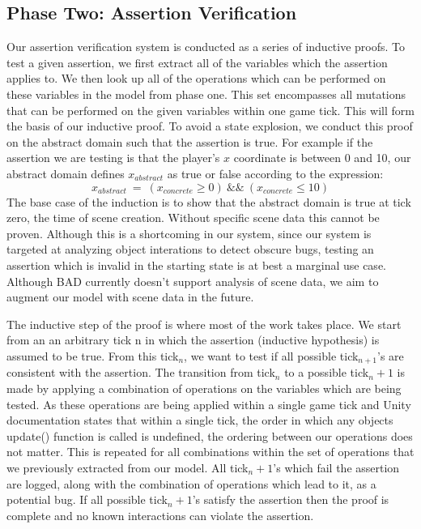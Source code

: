 \documentclass[letterpaper,twocolumn,10pt]{article}
\begin{document}
\subsection{Phase Two: Assertion Verification}

Our assertion verification system is conducted as a series of inductive proofs. To test a given assertion, we first extract all of the variables which the assertion applies to. We then look up all of the operations which can be performed on these variables in the model from phase one. This set encompasses all mutations that can be performed on the given variables within one game tick. This will form the basis of our inductive proof. To avoid a state explosion, we conduct this proof on the abstract domain such that the assertion is true. For example if the assertion we are testing is that the player's $x$ coordinate is between 0 and 10, our abstract domain defines $x_{abstract}$ as true or false according to the expression:
\begin{displaymath}x_{abstract}~=~(x_{concrete}\geq0)~\&\&~(x_{concrete}\leq10)
\end{displaymath}
The base case of the induction is to show that the abstract domain is true at tick zero, the time of scene creation. Without specific scene data this cannot be proven. Although this is a shortcoming in our system, since our system is targeted at analyzing object interations to detect obscure bugs, testing an assertion which is invalid in the starting state is at best a marginal use case. Although BAD currently doesn't support analysis of scene data, we aim to augment our model with scene data in the future.

The inductive step of the proof is where most of the work takes place. We start from an an arbitrary tick n in which the assertion (inductive hypothesis) is assumed to be true. From this tick$_n$, we want to test if all possible tick$_{n+1}$'s are consistent with the assertion. The transition from tick$_n$ to a possible tick$_n+1$ is made by applying a combination of operations on the variables which are being tested. As these operations are being applied within a single game tick and Unity documentation states that within a single tick, the order in which any objects update() function is called is undefined, the ordering between our operations does not matter. This is repeated for all combinations within the set of operations that we previously extracted from our model. All tick$_n+1$'s which fail the assertion are logged, along with the combination of operations which lead to it, as a potential bug. If all possible tick$_n+1$'s satisfy the assertion then the proof is complete and no known interactions can violate the assertion.
\end{document}
